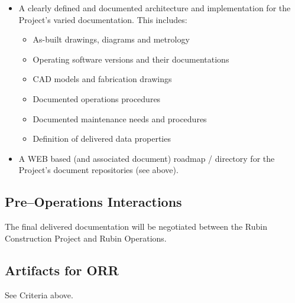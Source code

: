 \begin{itemize}

	\item A clearly defined and documented architecture and implementation for the Project's varied documentation.  This includes:
	\begin{itemize}
		\item As-built drawings, diagrams and metrology
		\item Operating software versions and their documentations
		\item CAD models and fabrication drawings
		\item Documented operations procedures
		\item Documented maintenance needs and procedures
		\item Definition of delivered data properties
	\end{itemize}
	
	\item A WEB based (and associated document) roadmap / directory for the Project's document repositories (see above).
	
\end{itemize}

\subsection{Pre--Operations Interactions}

The final delivered documentation will be negotiated between the Rubin Construction Project and Rubin Operations.

\subsection{Artifacts for ORR}

See Criteria above.
